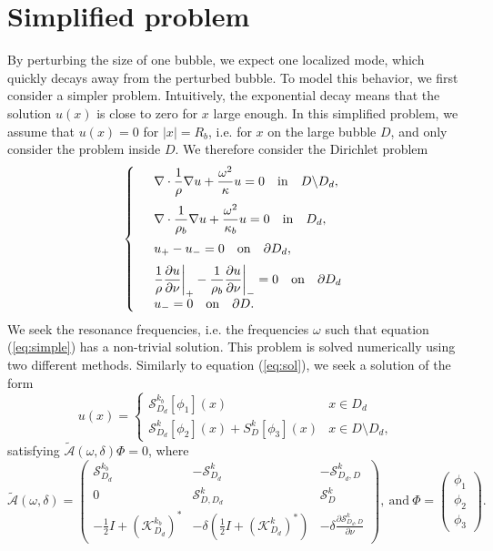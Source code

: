 \documentclass[a4paper]{article}
\theoremstyle{definition}
\newcommand{\A}{\mathcal{A}}
\newcommand{\ds}{\displaystyle}
\newcommand{\eqnref}[1]{(\ref {#1})}
\def\nm{\noalign{\medskip}}
\begin{document}
\section{Simplified problem}
By perturbing the size of one bubble, we expect one localized mode, which quickly decays away from the perturbed bubble. To model this behavior, we first consider a simpler problem. Intuitively, the exponential decay means that the solution $u(x)$ is close to zero for $x$ large enough. In this simplified problem, we assume that $u(x)=0$ for $|x|=R_b$, i.e. for $x$ on the large bubble $D$, and only consider the problem inside $D$. We therefore consider the Dirichlet problem
\begin{equation} \label{eq:simple}
\left\{
\begin{array} {ll}
&\ds \nabla \cdot \frac{1}{\rho} \nabla  u+ \frac{\omega^2}{\kappa} u  = 0 \quad \text{in} \quad D \backslash D_d, \\
\nm
&\ds \nabla \cdot \frac{1}{\rho_b} \nabla  u+ \frac{\omega^2}{\kappa_b} u  = 0 \quad \text{in} \quad D_d, \\
\nm
&\ds  u_{+} -u_{-}  =0   \quad \text{on} \quad \partial D_d, \\
\nm
& \ds  \frac{1}{\rho} \frac{\partial u}{\partial \nu} \bigg|_{+} - \frac{1}{\rho_b} \frac{\partial u}{\partial \nu} \bigg|_{-} =0 \quad \text{on} \quad \partial D_d \\
&\ds u_- = 0 \quad \text{on} \quad \partial D.
\end{array}
\right .
\end{equation}
We seek the resonance frequencies, i.e. the frequencies $\omega$ such that equation \eqnref{eq:simple} has a non-trivial solution. This problem is solved numerically using two different methods. Similarly to equation \eqnref{eq:sol}, we seek a solution of the form 
\begin{equation} \label{eq:simplesol}
u(x) = \begin{cases}
\mathcal{S}_{D_d}^{k_b}[\phi_1](x) \quad &x\in D_d \\
\mathcal{S}_{D_d}^{k}[\phi_2](x) + S_D^k[\phi_3](x) & x\in D\setminus D_d,
\end{cases}
\end{equation}
satisfying $\tilde{\A}(\omega, \delta)\Phi = 0$, where
\begin{equation} \label{eq:simpleA}
\tilde{\A}(\omega, \delta) = 
\begin{pmatrix}
\mathcal{S}_{D_d}^{k_b} &  -\mathcal{S}_{D_d}^{k} & -\mathcal{S}_{D_d,D}^{k} \\
0 & \mathcal{S}_{D,D_d}^k & \mathcal{S}_{D}^k \\
-\frac{1}{2}I+ (\mathcal{K}_{D_d}^{k_b})^*& -\delta\left( \frac{1}{2}I+ \left(\mathcal{K}_{D_d}^{k}\right)^*\right) & -\delta \frac{\partial \mathcal{S}_{D_d,D}^{k}}{\partial \nu}
\end{pmatrix}, 
\ \text{and}  \ \Phi= 
\begin{pmatrix}
\phi_1\\
\phi_2 \\
\phi_3
\end{pmatrix}.
\end{equation}
\end{document}
